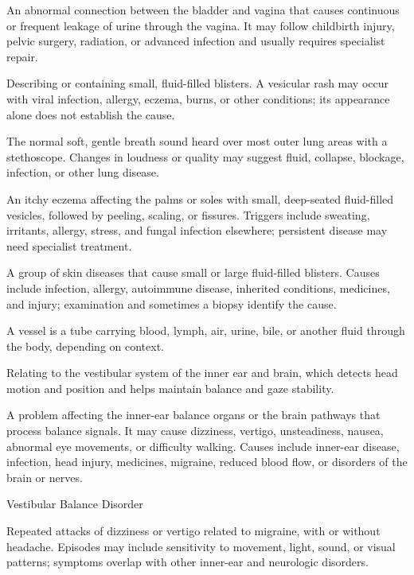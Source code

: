  An abnormal connection between the bladder and vagina that causes continuous or frequent leakage of urine through the vagina. It may follow childbirth injury, pelvic surgery, radiation, or advanced infection and usually requires specialist repair.

 Describing or containing small, fluid-filled blisters. A vesicular rash may occur with viral infection, allergy, eczema, burns, or other conditions; its appearance alone does not establish the cause.

 The normal soft, gentle breath sound heard over most outer lung areas with a stethoscope. Changes in loudness or quality may suggest fluid, collapse, blockage, infection, or other lung disease.

 An itchy eczema affecting the palms or soles with small, deep-seated fluid-filled vesicles, followed by peeling, scaling, or fissures. Triggers include sweating, irritants, allergy, stress, and fungal infection elsewhere; persistent disease may need specialist treatment.

 A group of skin diseases that cause small or large fluid-filled blisters. Causes include infection, allergy, autoimmune disease, inherited conditions, medicines, and injury; examination and sometimes a biopsy identify the cause.

 A vessel is a tube carrying blood, lymph, air, urine, bile, or another fluid through the body, depending on context.

 Relating to the vestibular system of the inner ear and brain, which detects head motion and position and helps maintain balance and gaze stability.

 A problem affecting the inner-ear balance organs or the brain pathways that process balance signals. It may cause dizziness, vertigo, unsteadiness, nausea, abnormal eye movements, or difficulty walking. Causes include inner-ear disease, infection, head injury, medicines, migraine, reduced blood flow, or disorders of the brain or nerves.

\synonyms
Vestibular Balance Disorder

 Repeated attacks of dizziness or vertigo related to migraine, with or without headache. Episodes may include sensitivity to movement, light, sound, or visual patterns; symptoms overlap with other inner-ear and neurologic disorders.

